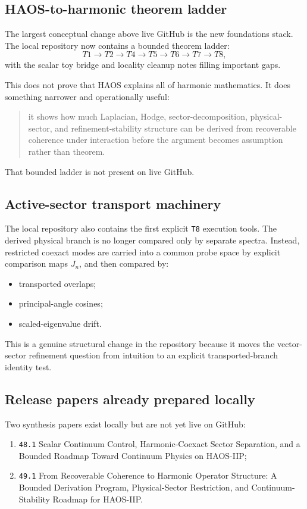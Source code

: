 \documentclass[11pt]{article}
\begin{document}
\subsection{HAOS-to-harmonic theorem ladder}

The largest conceptual change above live GitHub is the new foundations stack. The local repository now contains a bounded theorem ladder:
\[
T1 \to T2 \to T4 \to T5 \to T6 \to T7 \to T8,
\]
with the scalar toy bridge and locality cleanup notes filling important gaps.

This does not prove that HAOS explains all of harmonic mathematics. It does something narrower and operationally useful:
\begin{quote}
it shows how much Laplacian, Hodge, sector-decomposition, physical-sector, and refinement-stability structure can be derived from recoverable coherence under interaction before the argument becomes assumption rather than theorem.
\end{quote}

That bounded ladder is not present on live GitHub.

\subsection{Active-sector transport machinery}

The local repository also contains the first explicit \texttt{T8} execution tools. The derived physical branch is no longer compared only by separate spectra. Instead, restricted coexact modes are carried into a common probe space by explicit comparison maps \(J_n\), and then compared by:
\begin{itemize}
\item transported overlaps;
\item principal-angle cosines;
\item scaled-eigenvalue drift.
\end{itemize}

This is a genuine structural change in the repository because it moves the vector-sector refinement question from intuition to an explicit transported-branch identity test.

\subsection{Release papers already prepared locally}

Two synthesis papers exist locally but are not yet live on GitHub:
\begin{enumerate}
\item \texttt{48.1} Scalar Continuum Control, Harmonic-Coexact Sector Separation, and a Bounded Roadmap Toward Continuum Physics on HAOS-IIP;
\item \texttt{49.1} From Recoverable Coherence to Harmonic Operator Structure: A Bounded Derivation Program, Physical-Sector Restriction, and Continuum-Stability Roadmap for HAOS-IIP.
\end{enumerate}
\end{document}
